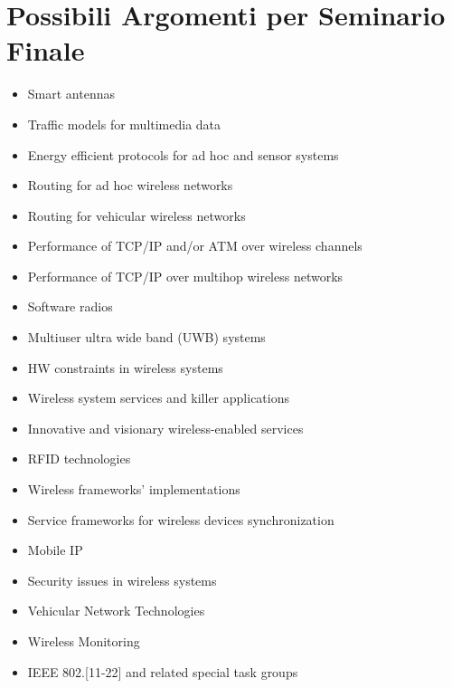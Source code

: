 \documentclass{article}
\begin{document}
\section*{Possibili Argomenti per Seminario Finale}
\begin{itemize}
    \item Smart antennas
    \item Traffic models for multimedia data
    \item Energy efficient protocols for ad hoc and sensor systems
    \item Routing for ad hoc wireless networks
    \item Routing for vehicular wireless networks
    \item Performance of TCP/IP and/or ATM over wireless channels
    \item Performance of TCP/IP over multihop wireless networks
    \item Software radios
    \item Multiuser ultra wide band (UWB) systems
    \item HW constraints in wireless systems
    \item Wireless system services and killer applications
    \item Innovative and visionary wireless-enabled services
    \item RFID technologies
    \item Wireless frameworks' implementations
    \item Service frameworks for wireless devices synchronization
    \item Mobile IP
    \item Security issues in wireless systems
    \item Vehicular Network Technologies
    \item Wireless Monitoring
    \item IEEE 802.[11-22] and related special task groups
\end{itemize}
\end{document}
